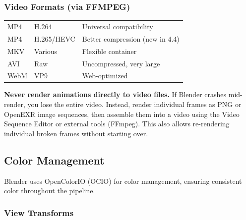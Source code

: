\subsubsection{Video Formats (via FFMPEG)}

\begin{center}
\begin{tabularx}{\textwidth}{L{2cm}L{3cm}X}
\toprule
{}
 &  &  \\
\midrule
MP4 & H.264 & Universal compatibility \\
MP4 & H.265/HEVC & Better compression (new in 4.4) \\
MKV & Various & Flexible container \\
AVI & Raw & Uncompressed, very large \\
WebM & VP9 & Web-optimized \\
\bottomrule
\end{tabularx}
\end{center}

\begin{warningbox}
\textbf{Never render animations directly to video files.} If
Blender crashes mid-render, you lose the entire video. Instead,
render individual frames as PNG or OpenEXR image sequences, then
assemble them into a video using the Video Sequence Editor or
external tools (FFmpeg). This also allows re-rendering individual
broken frames without starting over.
\end{warningbox}

\subsection{Color Management}
\label{sec:shading:colormanagement}

Blender uses OpenColorIO (OCIO) for color management, ensuring
consistent color throughout the pipeline.

\subsubsection{View Transforms}

